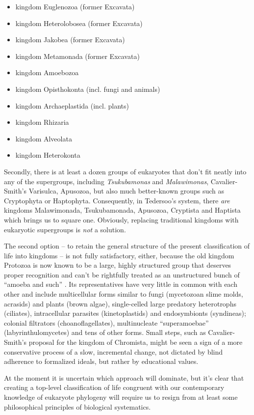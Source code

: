 \begin{artengenv}
\begin{itemize}
\item kingdom Euglenozoa (former Excavata)
\item kingdom Heterolobosea (former Excavata)
\item kingdom Jakobea (former Excavata)
\item kingdom Metamonada (former Excavata)
\item kingdom Amoebozoa
\item kingdom Opisthokonta (incl. fungi and animals)
\item kingdom Archaeplastida (incl. plants)
\item kingdom Rhizaria
\item kingdom Alveolata
\item kingdom Heterokonta
\end{itemize}
Secondly, there is at least a dozen groups of eukaryotes that don’t fit neatly into any of the supergroups, including
\textit{Tsukubamonas} and \textit{Malawimonas}, Cavalier-Smith’s Varisulca, Apusozoa, but also much better-known groups
such as Cryptophyta or Haptophyta. Consequently, in Tedersoo’s system, there \textit{are} kingdoms Malawimonada,
Tsukubamonada, Apusozoa, Cryptista and Haptista which brings us to square one. Obviously, replacing traditional
kingdoms with eukaryotic supergroups is \textit{not }a solution.

The second option -- to retain the general structure of the present classification of life into kingdoms -- is not fully
satisfactory, either, because the old kingdom Protozoa is now known to be a large, highly structured group that
deserves proper recognition and can’t be rightfully treated as an unstructured bunch of ``amoeba and such''
\parencite[see][]{patterson_diversity_1999}.
Its representatives have very little in common with each other and
include multicellular forms similar to fungi (mycetozoan slime molds, acrasids) and plants (brown algae), single-celled
large predatory heterotrophs (ciliates), intracellular parasites (kinetoplastids) and endosymbionts (syndineas);
colonial filtrators (choanoflagellates), multinucleate ``superamoebae'' (labyrinthulomycetes) and tens of other forms.
Small steps, such as Cavalier-Smith’s proposal for the kingdom of Chromista, might be seen a sign of a more
conservative process of a slow, incremental change, not dictated by blind adherence to formalized ideals, but rather by
educational values.

At the moment it is uncertain which approach will dominate, but it’s clear that creating a top-level classification of
life congruent with our contemporary knowledge of eukaryote phylogeny will require us to resign from at least some
philosophical principles of biological systematics.

\end{artengenv}